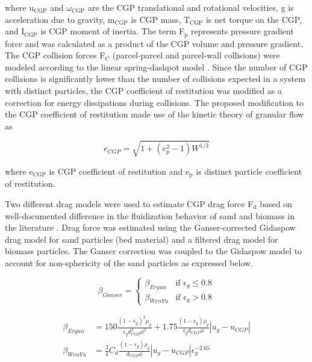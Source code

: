 \documentclass{article}
\begin{document}
\noindent where u$_\text{CGP}$ and $\omega_\text{CGP}$ are the CGP translational and rotational velocities, g is acceleration due to gravity, m$_\text{CGP}$ is CGP mass, T$_\text{CGP}$ is net torque on the CGP, and I$_\text{CGP}$ is CGP moment of inertia. The term F$_\text{p}$ represents pressure gradient force and was calculated as a product of the CGP volume and pressure gradient. The CGP collision forces F$_\text{C}$ (parcel-parcel and parcel-wall collisions) were modeled according to the linear spring-dashpot model \cite{Navarro-2013}. Since the number of CGP collisions is significantly lower than the number of collisions expected in a system with distinct particles, the CGP coefficient of restitution was modified as a correction for energy dissipations during collisions. The proposed modification to the CGP coefficient of restitution made use of the kinetic theory of granular flow \cite{Lu-2014} as

\begin{equation}
    e_{CGP} = \sqrt{1 + (e_p^2 - 1) W^{1/3}}
\end{equation}

\noindent where e$_\text{CGP}$ is CGP coefficient of restitution and e$_\text{p}$ is distinct particle coefficient of restitution.

Two different drag models were used to estimate CGP drag force F$_\text{d}$ based on well-documented difference in the fluidization behavior of sand and biomass in the literature \cite{Oliveira-2013}. Drag force was estimated using the Ganser-corrected Gidaspow drag model for sand particles (bed material) and a filtered drag model for biomass particles. The Ganser correction \cite{Ganser-1993} was coupled to the Gidaspow model \cite{Gidaspow-1994} to account for non-sphericity of the sand particles as expressed below.

\begin{equation}
    \beta_{Ganser} =
    \begin{cases}
        \beta_{Ergun} & \text{if } \epsilon_g \leq 0.8 \\
        \beta_{WenYu} & \text{if } \epsilon_g > 0.8
    \end{cases}
\end{equation}

\begin{align}
    \beta_{Ergun} &= 150 \frac{(1 - \epsilon_g)^2 \mu_g}{\epsilon_g d^2_{CGP} \phi^2} + 1.75 \frac{(1 - \epsilon_g) \rho_g}{\epsilon_g d_{CGP} \phi} |u_g - u_{CGP}| \\
    \beta_{WenYu} &= \frac{3}{4} C_d \frac{(1 - \epsilon_g) \rho_g}{d_{CGP} \phi} |u_g - u_{CGP}| \epsilon_g^{-2.65}
\end{align}
\end{document}

